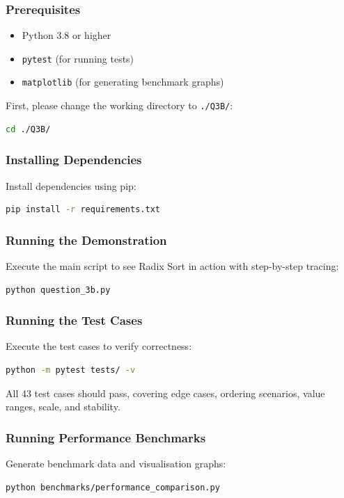 \documentclass[12pt]{article}
\begin{document}
\subsubsection{Prerequisites}
\begin{itemize}
    \item Python 3.8 or higher
    \item \texttt{pytest} (for running tests)
    \item \texttt{matplotlib} (for generating benchmark graphs)
\end{itemize}

\medskip
\noindent First, please change the working directory to \texttt{./Q3B/}:
\begin{lstlisting}[language=bash]
cd ./Q3B/
\end{lstlisting}

\subsubsection{Installing Dependencies}
Install dependencies using pip:
\begin{lstlisting}[language=bash]
pip install -r requirements.txt
\end{lstlisting}

\subsubsection{Running the Demonstration}
Execute the main script to see Radix Sort in action with step-by-step tracing:
\begin{lstlisting}[language=bash]
python question_3b.py
\end{lstlisting}

\subsubsection{Running the Test Cases}
Execute the test cases to verify correctness:
\begin{lstlisting}[language=bash]
python -m pytest tests/ -v
\end{lstlisting}

All 43 test cases should pass, covering edge cases, ordering scenarios, value ranges, scale, and stability.

\subsubsection{Running Performance Benchmarks}
Generate benchmark data and visualisation graphs:
\begin{lstlisting}[language=bash]
python benchmarks/performance_comparison.py
\end{lstlisting}
\end{document}
